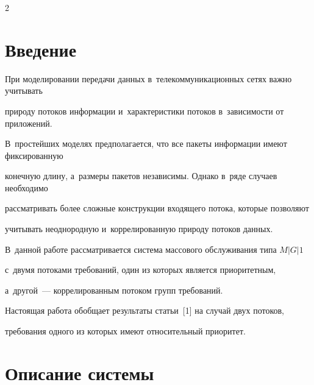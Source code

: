 \thispagestyle{headings}





\begin{multicols}{2}





\label{st\stat}





\section{Введение}





При моделировании передачи данных в~телекоммуникационных сетях важно учитывать 


природу потоков информации и~характеристики потоков в~зависимости от приложений. 


В~простейших моделях предполагается, что все пакеты информации имеют фиксированную 


конечную длину, а~размеры пакетов независимы. Однако в~ряде случаев необходимо 


рассматривать более сложные конструкции входящего потока, которые позволяют 


учитывать неоднородную и~коррелированную природу потоков данных. 


В~данной работе рассматривается сис\-те\-ма массового обслуживания типа $M|G|1$ 


с~двумя потоками требований, один из которых является приоритетным, 


а~другой~--- коррелированным потоком групп требований.





Настоящая работа обобщает результаты \mbox{статьи}~[1] на случай двух потоков, 


требования одного из которых имеют относительный приоритет.





\vspace*{-9pt}





\section{Описание системы}






\end{multicols}
